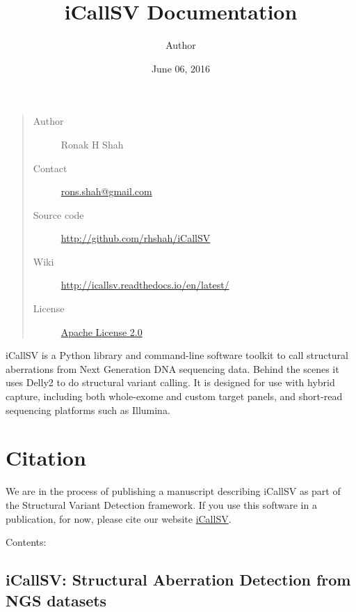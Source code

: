 \documentclass[letterpaper,10pt,english]{sphinxmanual}
\title{iCallSV Documentation}
\date{June 06, 2016}
\author{Author}
\begin{document}
\maketitle
\tableofcontents
{}\label{index::doc}

\begin{quote}\begin{description}
\item[{Author}] \leavevmode
Ronak H Shah

\item[{Contact}] \leavevmode
\href{mailto:rons.shah@gmail.com}{rons.shah@gmail.com}

\item[{Source code}] \leavevmode
\href{http://github.com/rhshah/iCallSV}{http://github.com/rhshah/iCallSV}

\item[{Wiki}] \leavevmode
\href{http://icallsv.readthedocs.io/en/latest/}{http://icallsv.readthedocs.io/en/latest/}

\item[{License}] \leavevmode
\href{http://www.apache.org/licenses/LICENSE-2.0}{Apache License 2.0}

\end{description}\end{quote}
\href{https://landscape.io/github/rhshah/iCallSV/master}{}
iCallSV is a Python library and command-line software toolkit to call structural aberrations from Next Generation DNA sequencing data. Behind the scenes it uses Delly2 to do structural variant calling. It is designed for use with hybrid capture, including both whole-exome and custom target panels, and
short-read sequencing platforms such as Illumina.


\chapter{Citation}
\label{index:citation}\label{index:icallsv-structural-aberration-detection-from-ngs-datasets}
We are in the process of publishing a manuscript describing iCallSV as part of the Structural Variant Detection framework.
If you use this software in a publication, for now, please cite our website \href{http://github.com/rhshah/iCallSV}{iCallSV}.

Contents:


\section{iCallSV: Structural Aberration Detection from NGS datasets}
\label{iCallSV::doc}\label{iCallSV:icallsv-structural-aberration-detection-from-ngs-datasets}
\end{document}
